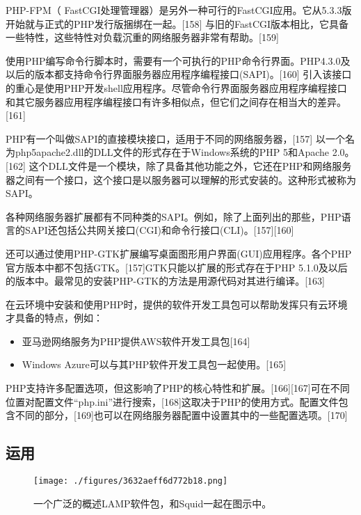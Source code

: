 PHP-FPM（ FastCGI处理管理器）是另外一种可行的FastCGI应用。它从5.3.3版开始就与正式的PHP发行版捆绑在一起。[158] 与旧的FastCGI版本相比，它具备一些特性，这些特性对负载沉重的网络服务器非常有帮助。[159]

使用PHP编写命令行脚本时，需要有一个可执行的PHP命令行界面。PHP4.3.0及以后的版本都支持命令行界面服务器应用程序编程接口(SAPI)。[160] 引入该接口的重心是使用PHP开发shell应用程序。尽管命令行界面服务器应用程序编程接口和其它服务器应用程序编程接口有许多相似点，但它们之间存在相当大的差异。[161]

PHP有一个叫做SAPI的直接模块接口，适用于不同的网络服务器，[157] 以一个名为php5apache2.dll的DLL文件的形式存在于Windows系统的PHP 5和Apache 2.0。[162] 这个DLL文件是一个模块，除了具备其他功能之外，它还在PHP和网络服务器之间有一个接口，这个接口是以服务器可以理解的形式安装的。这种形式被称为SAPI。

各种网络服务器扩展都有不同种类的SAPI。例如，除了上面列出的那些，PHP语言的SAPI还包括公共网关接口(CGI)和命令行接口(CLI)。[157][160]

还可以通过使用PHP-GTK扩展编写桌面图形用户界面(GUI)应用程序。各个PHP官方版本中都不包括GTK。[157]GTK只能以扩展的形式存在于PHP 5.1.0及以后的版本中。最常见的安装PHP-GTK的方法是用源代码对其进行编译。[163]

在云环境中安装和使用PHP时，提供的软件开发工具包可以帮助发挥只有云环境才具备的特点，例如：
\begin{itemize}
\item 亚马逊网络服务为PHP提供AWS软件开发工具包[164]
\item Windows Azure可以与其PHP软件开发工具包一起使用。[165]
\end{itemize}
PHP支持许多配置选项，但这影响了PHP的核心特性和扩展。[166][167]可在不同位置对配置文件“php.ini”进行搜索，[168]这取决于PHP的使用方式。配置文件包含不同的部分，[169]也可以在网络服务器配置中设置其中的一些配置选项。[170]

\subsection{运用}
\begin{figure}[ht]
\centering
\texttt{[image: ./figures/3632aeff6d772b18.png]}
\caption{一个广泛的概述LAMP软件包，和Squid一起在图示中。} \label{fig_PHP_6}
\end{figure}
